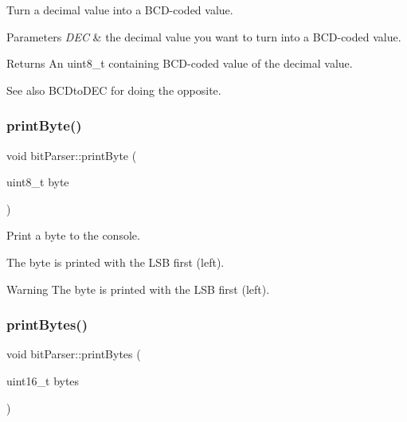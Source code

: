 Turn a decimal value into a B\+C\+D-\/coded value. 


\begin{DoxyParams}{Parameters}
{\em D\+EC} & the decimal value you want to turn into a B\+C\+D-\/coded value. \\
\hline
\end{DoxyParams}
\begin{DoxyReturn}{Returns}
An uint8\+\_\+t containing B\+C\+D-\/coded value of the decimal value. 
\end{DoxyReturn}
\begin{DoxySeeAlso}{See also}
B\+C\+Dto\+D\+EC for doing the opposite. 
\end{DoxySeeAlso}
\mbox{\label{group__bit_parser_ga59838a77502d6d7f71258ff348055510}} 
\subsubsection{\texorpdfstring{print\+Byte()}{printByte()}}
{\footnotesize\ttfamily void bit\+Parser\+::print\+Byte (\begin{DoxyParamCaption}\item[{uint8\+\_\+t}]{byte }\end{DoxyParamCaption})}



Print a byte to the console. 

The byte is printed with the L\+SB first (left). \begin{DoxyWarning}{Warning}
The byte is printed with the L\+SB first (left). 
\end{DoxyWarning}
\mbox{\label{group__bit_parser_ga25b5179d0eec3cf5d3f465c7b2c179b6}} 
\subsubsection{\texorpdfstring{print\+Bytes()}{printBytes()}}
{\footnotesize\ttfamily void bit\+Parser\+::print\+Bytes (\begin{DoxyParamCaption}\item[{uint16\+\_\+t}]{bytes }\end{DoxyParamCaption})}



